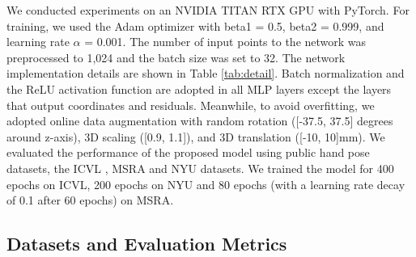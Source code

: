 \documentclass[10pt,twocolumn,letterpaper]{article}
\begin{document}
We conducted experiments on an NVIDIA TITAN RTX GPU with PyTorch. For training, we used the Adam optimizer \cite{kingma2014adam} with beta1 = 0.5, beta2 = 0.999, and learning rate $\alpha$ = 0.001. The number of input points to the network was preprocessed to 1,024 and the batch size was set to 32. The network implementation details are shown in Table \ref{tab:detail}. Batch normalization \cite{ioffe2015batch} and the ReLU \cite{nair2010rectified} activation function are adopted in all MLP layers except the layers that output coordinates and residuals. Meanwhile, to avoid overfitting, we adopted online data augmentation with random rotation ([-37.5, 37.5] degrees around z-axis), 3D scaling ([0.9, 1.1]), and 3D translation ([-10, 10]mm). We evaluated the performance of the proposed model using public hand pose datasets, the ICVL \cite{tang2014latent}, MSRA \cite{sun2015cascaded} and NYU \cite{tompson2014real} datasets. We trained the model for 400 epochs on ICVL, 200 epochs on NYU and 80 epochs (with a learning rate decay of 0.1 after 60 epochs) on MSRA.



\subsection{Datasets and Evaluation Metrics}
\end{document}
